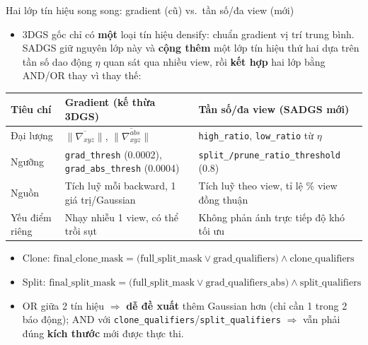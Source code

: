 \begin{frame}{Hai lớp tín hiệu song song: gradient (cũ) vs.\ tần số/đa view (mới)}
\footnotesize
\begin{itemize}
    \item 3DGS gốc chỉ có \textbf{một} loại tín hiệu densify: chuẩn gradient vị trí trung bình. SADGS giữ nguyên lớp này và \textbf{cộng thêm} một lớp tín hiệu thứ hai dựa trên tần số dao động $\eta$ quan sát qua nhiều view, rồi \textbf{kết hợp} hai lớp bằng AND/OR thay vì thay thế:
\end{itemize}
\vspace{0.2em}
\centering
\begin{tabular}{lll}
\toprule
\textbf{Tiêu chí} & \textbf{Gradient (kế thừa 3DGS)} & \textbf{Tần số/đa view (SADGS mới)} \\
\midrule
Đại lượng & $\|\overline{\nabla_{xyz}}\|$, $\|\overline{\nabla_{xyz}^{abs}}\|$ & \texttt{high\_ratio}, \texttt{low\_ratio} từ $\eta$ \\
Ngưỡng & \texttt{grad\_thresh} (0.0002), \texttt{grad\_abs\_thresh} (0.0004) & \texttt{split\_/prune\_ratio\_threshold} (0.8) \\
Nguồn & Tích luỹ mỗi backward, 1 giá trị/Gaussian & Tích luỹ theo view, tỉ lệ \% view đồng thuận \\
Yếu điểm riêng & Nhạy nhiễu 1 view, có thể trồi sụt & Không phản ánh trực tiếp độ khó tối ưu \\
\bottomrule
\end{tabular}
\vspace{0.4em}
\footnotesize
\begin{itemize}
    \item Clone: $\text{final\_clone\_mask} = \big(\text{full\_split\_mask} \lor \text{grad\_qualifiers}\big) \wedge \text{clone\_qualifiers}$
    \item Split: $\text{final\_split\_mask} = \big(\text{full\_split\_mask} \lor \text{grad\_qualifiers\_abs}\big) \wedge \text{split\_qualifiers}$
    \item OR giữa 2 tín hiệu $\Rightarrow$ \textbf{dễ đề xuất} thêm Gaussian hơn (chỉ cần 1 trong 2 báo động); AND với \texttt{clone\_qualifiers}/\texttt{split\_qualifiers} $\Rightarrow$ vẫn phải đúng \textbf{kích thước} mới được thực thi.
\end{itemize}
\end{frame}


